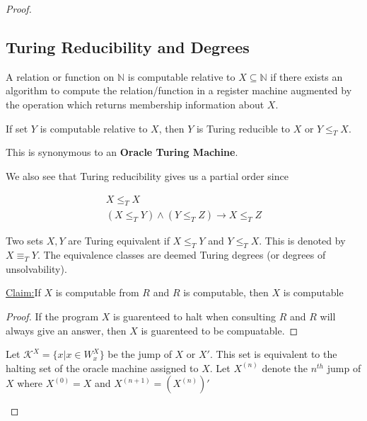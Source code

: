 \documentclass[a4paper,10pt]{article}
\newenvironment{claim}[1]{\par\noindent\underline{Claim:}\space#1}{}
\newenvironment{definition}[1][Definition]{\begin{trivlist}
\item[\hskip \labelsep {\bfseries #1}]}{\end{trivlist}}
\newcommand*\NN{\mathbb{N}}
\newcommand*\map{\rightarrow}
\newcommand*\n{\newline\par}
\newcommand*\turred{\leq_T}
\newcommand*\tureq{\equiv_T}
\newcommand*\halt{\mathcal{K}}
\begin{document}
\begin{proof}
    \subsection{Turing Reducibility and Degrees}
    
    \begin{definition}
     A relation or function on $\NN$ is computable relative to $X \subseteq \NN$ if there exists an algorithm to compute the relation/function in a register machine augmented by the operation which
     returns membership information about $X$.
    \end{definition}
    
    
    \begin{definition}
     If set $Y$ is computable relative to $X$, then $Y$ is Turing reducible to $X$ or $Y \turred X$.
    \end{definition}
    This is synonymous to an {\bf Oracle Turing Machine}. \n
      
    
    We also see that Turing reducibility gives us a partial order since 
    
    \begin{gather*}
     X \turred X \\
     (X \turred Y) \land (Y \turred Z) \map X \turred Z
    \end{gather*}

    \begin{definition}
     Two sets $X,Y$ are Turing equivalent if $X \turred Y$ and $Y \turred X$. This is denoted by $X \tureq Y$. The equivalence classes are deemed Turing degrees (or degrees of unsolvability).
    \end{definition}
    
     \begin{claim}
     If $X$ is computable from $R$ and $R$ is computable, then $X$ is computable 
    \end{claim} 
    
    \begin{proof}
     If the program $X$ is guarenteed to halt when consulting $R$ and $R$ will always give an answer, then $X$ is guarenteed to be compuatable.
    \end{proof}
 
    \begin{definition}
     Let $\halt^X = \{x \vert x \in W_x^X\}$ be the jump of $X$ or $X'$. This set is equivalent to the halting set of the oracle machine assigned to $X$. Let $X^{(n)}$ denote the $n^{th}$ jump of $X$ where $X^{(0)} = X$ and $X^{(n+1)} = (X^{(n)})'$
    \end{definition}


\end{proof}
\end{document}
